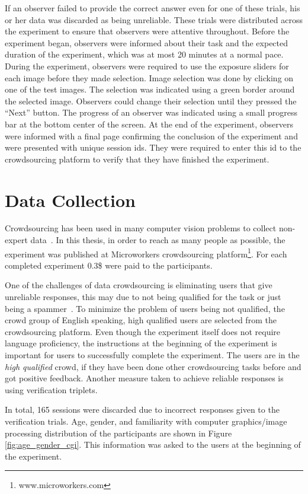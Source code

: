If an observer failed to provide the correct answer even for one of these trials, his or her data was discarded as being unreliable. These trials were distributed across the experiment to ensure that observers were attentive throughout. Before the experiment began, observers were informed about their task and the expected duration of the experiment, which was at most 20 minutes at a normal pace. During the experiment, observers were required to use the exposure sliders for each image before they made selection. Image selection was done by clicking on one of the test images. The selection was indicated using a green border around the selected image. Observers could change their selection until they pressed the “Next” button. The progress of an observer was indicated using a small progress bar at the bottom center of the screen. At the end of the experiment, observers were informed with a final page confirming the conclusion of the experiment and were presented with unique session ids. They were required to enter this id to the crowdsourcing platform to verify that they have finished the experiment.

\section{Data Collection}
\label{sec:crowd_sourcing}
Crowdsourcing has been used in many computer vision problems to collect non-expert data~\cite{kovashka2016crowdsourcing}. In this thesis, in order to reach as many people as possible, the experiment was published at Microworkers crowdsourcing platform\footnote{www.microworkers.com}. For each completed experiment 0.3\$ were paid to the participants.

One of the challenges of data crowdsourcing is eliminating users that give unreliable responses, this may due to not being qualified for the task or just being a spammer~\cite{garcia2016challenges}. To minimize the problem of users being not qualified, the crowd group of English speaking, high qualified users are selected from the crowdsourcing platform. Even though the experiment itself does not require language proficiency, the instructions at the beginning of the experiment is important for users to successfully complete the experiment. The users are in the \emph{high qualified} crowd, if they have been done other crowdsourcing tasks before and got positive feedback. Another measure taken to achieve reliable responses is using verification triplets.

In total, 165 sessions were discarded due to incorrect responses given to the verification trials. Age, gender, and familiarity with computer graphics/image processing distribution of the participants are shown in Figure \ref{fig:age_gender_cgi}. This information was asked to the users at the beginning of the experiment.

